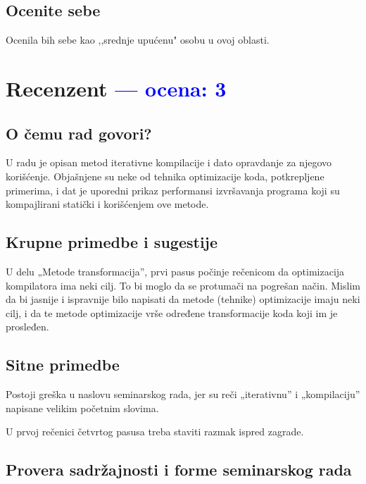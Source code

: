 \documentclass[a4paper]{report}
\newcommand{\odgovor}[1]{\textcolor{blue}{#1}}
\begin{document}
\section{Ocenite sebe}
Ocenila bih sebe kao ,,srednje upućenu" osobu u ovoj oblasti.


\chapter{Recenzent \odgovor{--- ocena: 3} }


\section{O čemu rad govori?}
U radu je opisan metod iterativne kompilacije i dato opravdanje za njegovo korišćenje. Objašnjene su neke od tehnika optimizacije koda, potkrepljene primerima, i dat je uporedni prikaz performansi izvršavanja programa koji su kompajlirani statički i korišćenjem ove metode. 

\section{Krupne primedbe i sugestije}
 

U delu „Metode transformacija”, prvi pasus počinje rečenicom da optimizacija kompilatora ima neki cilj. To bi moglo da se protumači na pogrešan način. Mislim da bi jasnije i ispravnije bilo napisati da metode (tehnike) optimizacije imaju neki cilj, i da te metode optimizacije vrše određene transformacije koda koji im je prosleđen.

\section{Sitne primedbe}
Postoji greška u naslovu seminarskog rada, jer su reči „iterativnu” i „kompilaciju” napisane velikim početnim slovima.

U prvoj rečenici četvrtog pasusa treba staviti razmak ispred zagrade.

\section{Provera sadržajnosti i forme seminarskog rada}
\end{document}
